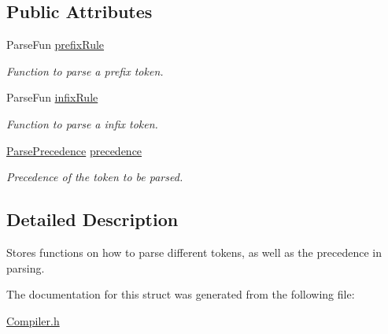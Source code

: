 \subsection*{Public Attributes}
\begin{DoxyCompactItemize}
\item 
\mbox{\label{struct_compiler_1_1_parse_rule_a4ffdde9cb2c8f1174b962e631a797d05}} 
Parse\+Fun \hyperlink{struct_compiler_1_1_parse_rule_a4ffdde9cb2c8f1174b962e631a797d05}{prefix\+Rule}
\begin{DoxyCompactList}\small\item\em Function to parse a prefix token. \end{DoxyCompactList}\item 
\mbox{\label{struct_compiler_1_1_parse_rule_ab5d5b4f17d1823c91c5ff30e52f21131}} 
Parse\+Fun \hyperlink{struct_compiler_1_1_parse_rule_ab5d5b4f17d1823c91c5ff30e52f21131}{infix\+Rule}
\begin{DoxyCompactList}\small\item\em Function to parse a infix token. \end{DoxyCompactList}\item 
\mbox{\label{struct_compiler_1_1_parse_rule_a62b8e0e92b8fac409c6fdd730b84f7c3}} 
\hyperlink{_compiler_8h_a916d5c37341c55c25b123d8c78439562}{Parse\+Precedence} \hyperlink{struct_compiler_1_1_parse_rule_a62b8e0e92b8fac409c6fdd730b84f7c3}{precedence}
\begin{DoxyCompactList}\small\item\em Precedence of the token to be parsed. \end{DoxyCompactList}\end{DoxyCompactItemize}


\subsection{Detailed Description}
Stores functions on how to parse different tokens, as well as the precedence in parsing. 

The documentation for this struct was generated from the following file\+:\begin{DoxyCompactItemize}
\item 
\hyperlink{_compiler_8h}{Compiler.\+h}\end{DoxyCompactItemize}
